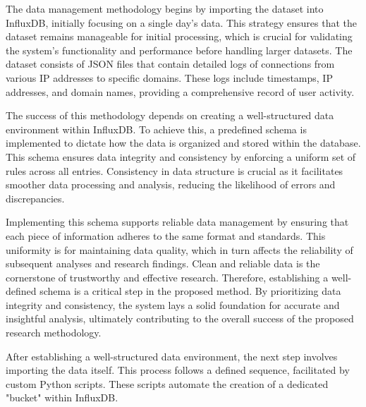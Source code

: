 The data management methodology begins by importing the dataset into InfluxDB, initially focusing on a single day's data. This strategy ensures that the dataset remains manageable for initial processing, which is crucial for validating the system's functionality and performance before handling larger datasets. The dataset consists of JSON files that contain detailed logs of connections from various IP addresses to specific domains. These logs include timestamps, IP addresses, and domain names, providing a comprehensive record of user activity.

The success of this methodology depends on creating a well-structured data environment within InfluxDB. To achieve this, a predefined schema is implemented to dictate how the data is organized and stored within the database. This schema ensures data integrity and consistency by enforcing a uniform set of rules across all entries. Consistency in data structure is crucial as it facilitates smoother data processing and analysis, reducing the likelihood of errors and discrepancies.

Implementing this schema supports reliable data management by ensuring that each piece of information adheres to the same format and standards. This uniformity is for maintaining data quality, which in turn affects the reliability of subsequent analyses and research findings. Clean and reliable data is the cornerstone of trustworthy and effective research. Therefore, establishing a well-defined schema is a critical step in the proposed method. By prioritizing data integrity and consistency, the system lays a solid foundation for accurate and insightful analysis, ultimately contributing to the overall success of the proposed research methodology.

After establishing a well-structured data environment, the next step involves importing the data itself. This process follows a defined sequence, facilitated by custom Python scripts. These scripts automate the creation of a dedicated "bucket" within InfluxDB.

